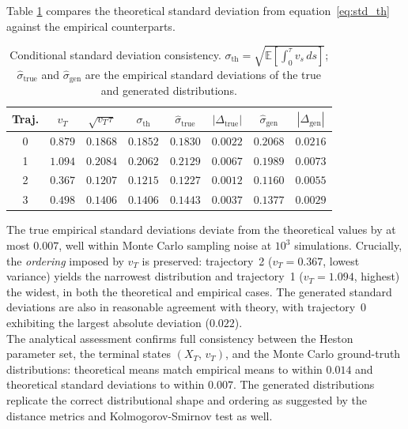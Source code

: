 Table \ref{tab:std_consistency} compares the theoretical standard deviation
from equation~\eqref{eq:std_th} against the empirical counterparts.

\begin{table}[H]
\centering
\caption{Conditional standard deviation consistency.
$\sigma_{\mathrm{th}} = \sqrt{\mathbb{E}[\int_0^\tau v_s\,ds]}$;
$\hat{\sigma}_{\mathrm{true}}$ and $\hat{\sigma}_{\mathrm{gen}}$ are the
empirical standard deviations of the true and generated distributions.}
\label{tab:std_consistency}
\begin{tabular}{cccccccc}
\toprule
Traj. & $v_T$ & $\sqrt{v_T\tau}$ & $\sigma_{\mathrm{th}}$
      & $\hat{\sigma}_{\mathrm{true}}$ & $|\Delta_{\mathrm{true}}|$
      & $\hat{\sigma}_{\mathrm{gen}}$ & $|\Delta_{\mathrm{gen}}|$ \\
\midrule
0 & $0.879$ & $0.1868$ & $0.1852$ & $0.1830$ & $0.0022$ & $0.2068$ & $0.0216$ \\
1 & $1.094$ & $0.2084$ & $0.2062$ & $0.2129$ & $0.0067$ & $0.1989$ & $0.0073$ \\
2 & $0.367$ & $0.1207$ & $0.1215$ & $0.1227$ & $0.0012$ & $0.1160$ & $0.0055$ \\
3 & $0.498$ & $0.1406$ & $0.1406$ & $0.1443$ & $0.0037$ & $0.1377$ & $0.0029$ \\
\bottomrule
\end{tabular}
\end{table}

The true empirical standard deviations deviate from the theoretical values
by at most $0.007$, well within Monte Carlo sampling noise at $10^3$
simulations.  Crucially, the \emph{ordering} imposed by $v_T$ is preserved:
trajectory~2 ($v_T = 0.367$, lowest variance) yields the narrowest
distribution and trajectory~1 ($v_T = 1.094$, highest) the widest, in both
the theoretical and empirical cases.  The generated standard deviations are also
in reasonable agreement with theory, with trajectory~0 exhibiting the largest
absolute deviation ($0.022$).\\


The analytical assessment confirms full consistency between the Heston
parameter set, the terminal states $(X_T,\,v_T)$, and the Monte Carlo ground-truth
distributions: theoretical means match empirical means to within $0.014$ and
theoretical standard deviations to within $0.007$.  The generated distributions
replicate the correct distributional shape and ordering as suggested by the 
distance metrics and Kolmogorov-Smirnov test as well.\\


